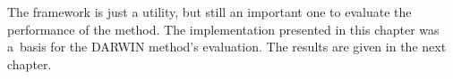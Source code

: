 The framework is just a utility, but still an important one to evaluate the
performance of the method. The implementation presented in this chapter was
a~basis for the DARWIN method's evaluation. The results are given in the next
chapter.

